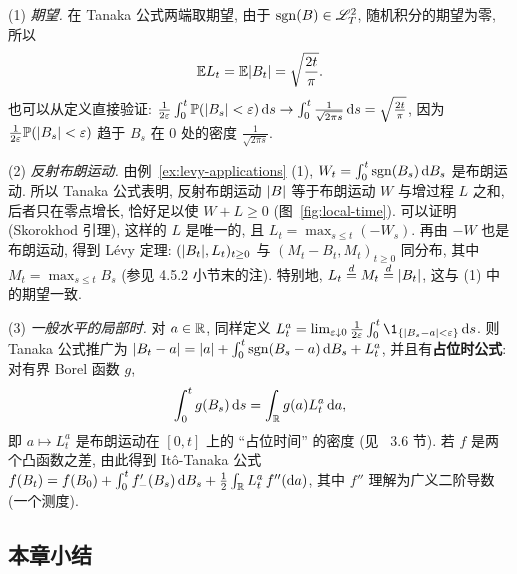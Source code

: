 \begin{example}[局部时的简单性质]\label{ex:local-time}
(1) \emph{期望.} 在 Tanaka 公式两端取期望, 由于 $\operatorname{sgn}(B)\in\mathscr{L}^2_T$, 随机积分的期望为零, 所以
\[
\mathbb{E} L_t=\mathbb{E}\lvert B_t\rvert=\sqrt{\frac{2t}{\pi}}.
\]
也可以从定义直接验证: $\frac{1}{2\varepsilon}\int_0^t\mathbb{P}(\lvert B_s\rvert<\varepsilon)\mathop{}\!\mathrm{d} s\to\int_0^t\frac{1}{\sqrt{2\pi s}}\mathop{}\!\mathrm{d} s=\sqrt{\frac{2t}{\pi}}$, 因为 $\frac{1}{2\varepsilon}\mathbb{P}(\lvert B_s\rvert<\varepsilon)$ 趋于 $B_s$ 在 $0$ 处的密度 $\frac{1}{\sqrt{2\pi s}}$.

(2) \emph{反射布朗运动.} 由例~\ref{ex:levy-applications} (1), $W_t=\int_0^t\operatorname{sgn}(B_s)\mathop{}\!\mathrm{d} B_s$ 是布朗运动. 所以 Tanaka 公式表明, 反射布朗运动 $\lvert B\rvert$ 等于布朗运动 $W$ 与增过程 $L$ 之和, 后者只在零点增长, 恰好足以使 $W+L\ge0$ (图~\ref{fig:local-time}). 可以证明 (Skorokhod 引理), 这样的 $L$ 是唯一的, 且 $L_t=\max_{s\le t}(-W_s)$. 再由 $-W$ 也是布朗运动, 得到 L\'evy 定理: $(\lvert B_t\rvert,L_t)_{t\ge0}$ 与 $(M_t-B_t,M_t)_{t\ge0}$ 同分布, 其中 $M_t=\max_{s\le t}B_s$ (参见 4.5.2 小节末的注). 特别地, $L_t\overset{d}{=}M_t\overset{d}{=}\lvert B_t\rvert$, 这与 (1) 中的期望一致.

(3) \emph{一般水平的局部时.} 对 $a\in\mathbb{R}$, 同样定义 $L^a_t=\lim_{\varepsilon\downarrow0}\frac{1}{2\varepsilon}\int_0^t\1_{\{\abs{B_s-a}<\varepsilon\}}\dd s$. 则 Tanaka 公式推广为 $\lvert B_t-a\rvert=\lvert a\rvert+\int_0^t\operatorname{sgn}(B_s-a)\mathop{}\!\mathrm{d} B_s+L^a_t$, 并且有\textbf{占位时公式}: 对有界 Borel 函数 $g$,
\[
\int_0^tg(B_s)\mathop{}\!\mathrm{d} s=\int_{\mathbb{R}}g(a)L^a_t\mathop{}\!\mathrm{d} a,
\]
即 $a\mapsto L^a_t$ 是布朗运动在 $[0,t]$ 上的 ``占位时间'' 的密度 (见~\cite{karatzas} 3.6 节). 若 $f$ 是两个凸函数之差, 由此得到 It\^o-Tanaka 公式 $f(B_t)=f(B_0)+\int_0^tf'_-(B_s)\mathop{}\!\mathrm{d} B_s+\frac{1}{2}\int_{\mathbb{R}}L^a_t\,f''(\mathop{}\!\mathrm{d} a)$, 其中 $f''$ 理解为广义二阶导数 (一个测度).
\end{example}

\subsection*{本章小结}

